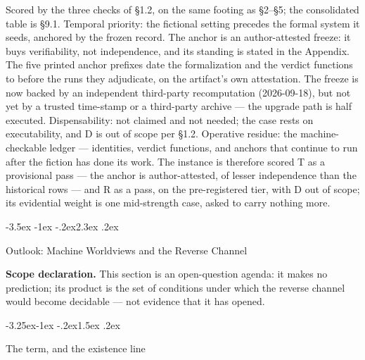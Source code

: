 \documentclass[11pt,a4paper]{article}
\makeatletter
\renewcommand\section{\@startsection{section}{1}{\z@}%
  {-3.5ex \@plus -1ex \@minus -.2ex}{2.3ex \@plus .2ex}%
  {\normalfont\Large\bfseries\raggedright}}
\renewcommand\subsection{\@startsection{subsection}{2}{\z@}%
  {-3.25ex\@plus -1ex \@minus -.2ex}{1.5ex \@plus .2ex}%
  {\normalfont\large\bfseries\raggedright}}
\makeatother
\begin{document}
Scored by the three checks of §1.2, on the same footing as §2–§5; the consolidated table is §9.1. Temporal priority: the fictional setting precedes the formal system it seeds, anchored by the frozen record. The anchor is an author-attested freeze: it buys verifiability, not independence, and its standing is stated in the Appendix. The five printed anchor prefixes date the formalization and the verdict functions to before the runs they adjudicate, on the artifact's own attestation. The freeze is now backed by an independent third-party recomputation (2026-09-18), but not yet by a trusted time-stamp or a third-party archive — the upgrade path is half executed. Dispensability: not claimed and not needed; the case rests on executability, and D is out of scope per §1.2. Operative residue: the machine-checkable ledger — identities, verdict functions, and anchors that continue to run after the fiction has done its work. The instance is therefore scored T as a provisional pass — the anchor is author-attested, of lesser independence than the historical rows — and R as a pass, on the pre-registered tier, with D out of scope; its evidential weight is one mid-strength case, asked to carry nothing more.

\section{Outlook: Machine Worldviews and the Reverse Channel}

\textbf{Scope declaration.} This section is an open-question agenda: it makes no prediction; its product is the set of conditions under which the reverse channel would become decidable — not evidence that it has opened.

\subsection{The term, and the existence line}
\end{document}
